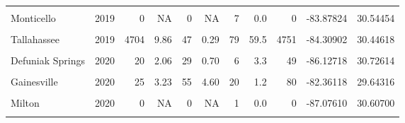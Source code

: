 \documentclass[12pt,final,CPage]{ufthesis}
\begin{document}
{\begin{table}[!h]
{\begin{tabular}[t]{lrrrrrrrrrr}
  \cellcolor{gray!6}{Midway} & \cellcolor{gray!6}{2019} & \cellcolor{gray!6}{0} & \cellcolor{gray!6}{0.00} & \cellcolor{gray!6}{0} & \cellcolor{gray!6}{0.00} & \cellcolor{gray!6}{2} & \cellcolor{gray!6}{0.0} & \cellcolor{gray!6}{0} & \cellcolor{gray!6}{-84.32201} & \cellcolor{gray!6}{30.44610}\\
  Monticello & 2019 & 0 & NA & 0 & NA & 7 & 0.0 & 0 & -83.87824 & 30.54454\\
  \addlinespace
  \cellcolor{gray!6}{Quincy} & \cellcolor{gray!6}{2019} & \cellcolor{gray!6}{0} & \cellcolor{gray!6}{0.00} & \cellcolor{gray!6}{9} & \cellcolor{gray!6}{1.13} & \cellcolor{gray!6}{7} & \cellcolor{gray!6}{0.0} & \cellcolor{gray!6}{9} & \cellcolor{gray!6}{-84.60175} & \cellcolor{gray!6}{30.56986}\\
  Tallahassee & 2019 & 4704 & 9.86 & 47 & 0.29 & 79 & 59.5 & 4751 & -84.30902 & 30.44618\\
  \cellcolor{gray!6}{Baldwin} & \cellcolor{gray!6}{2020} & \cellcolor{gray!6}{27} & \cellcolor{gray!6}{1.31} & \cellcolor{gray!6}{15} & \cellcolor{gray!6}{1.55} & \cellcolor{gray!6}{4} & \cellcolor{gray!6}{6.8} & \cellcolor{gray!6}{42} & \cellcolor{gray!6}{-81.97352} & \cellcolor{gray!6}{30.30268}\\
  Defuniak Springs & 2020 & 20 & 2.06 & 29 & 0.70 & 6 & 3.3 & 49 & -86.12718 & 30.72614\\
  \cellcolor{gray!6}{Ferry Pass} & \cellcolor{gray!6}{2020} & \cellcolor{gray!6}{0} & \cellcolor{gray!6}{NA} & \cellcolor{gray!6}{0} & \cellcolor{gray!6}{NA} & \cellcolor{gray!6}{2} & \cellcolor{gray!6}{0.0} & \cellcolor{gray!6}{0} & \cellcolor{gray!6}{-87.21893} & \cellcolor{gray!6}{30.54415}\\
  \addlinespace
  Gainesville & 2020 & 25 & 3.23 & 55 & 4.60 & 20 & 1.2 & 80 & -82.36118 & 29.64316\\
  \cellcolor{gray!6}{Jacksonville} & \cellcolor{gray!6}{2020} & \cellcolor{gray!6}{66} & \cellcolor{gray!6}{1.13} & \cellcolor{gray!6}{41} & \cellcolor{gray!6}{1.67} & \cellcolor{gray!6}{8} & \cellcolor{gray!6}{8.2} & \cellcolor{gray!6}{107} & \cellcolor{gray!6}{-81.68811} & \cellcolor{gray!6}{30.39848}\\
  Milton & 2020 & 0 & NA & 0 & NA & 1 & 0.0 & 0 & -87.07610 & 30.60700\\
  \cellcolor{gray!6}{Orlando} & \cellcolor{gray!6}{2020} & \cellcolor{gray!6}{0} & \cellcolor{gray!6}{NA} & \cellcolor{gray!6}{0} & \cellcolor{gray!6}{NA} & \cellcolor{gray!6}{4} & \cellcolor{gray!6}{0.0} & \cellcolor{gray!6}{0} & \cellcolor{gray!6}{-81.51605} & \cellcolor{gray!6}{28.50670}\\

\end{tabular}}
\end{table}}
\end{document}
